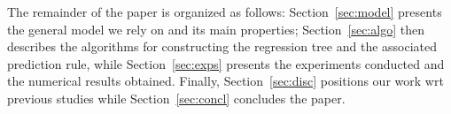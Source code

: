 The remainder of the paper is organized as follows: Section~\ref{sec:model} presents the general model we rely on and its main properties; Section~\ref{sec:algo} then describes the algorithms for constructing the regression tree and the associated prediction rule, while Section~\ref{sec:exps} presents the experiments conducted and the numerical results obtained. Finally, Section~\ref{sec:disc} positions our work wrt previous studies while Section~\ref{sec:concl} concludes the paper.

